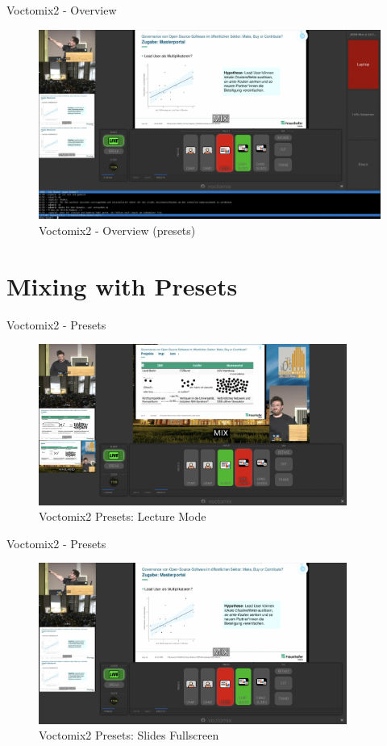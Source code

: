 
\begin{frame}{Voctomix2 - Overview}
	\begin{figure}
		\centering
		\includegraphics[width=.8\textwidth]{images/voctomix2-overview.jpg}
		\caption{Voctomix2 - Overview (presets)}
	\end{figure}
\end{frame}

\section{Mixing with Presets}
\begin{frame}{Voctomix2 - Presets}
	\begin{figure}
		\centering
		\includegraphics[width=0.9\textwidth]{images/voctomix2-presets-lecture.jpg}
		\caption{Voctomix2 Presets: Lecture Mode}
	\end{figure}
\end{frame}

\begin{frame}{Voctomix2 - Presets}
	\begin{figure}
		\centering
		\includegraphics[width=0.9\textwidth]{images/voctomix2-presets-slides.jpg}
		\caption{Voctomix2 Presets: Slides Fullscreen}
	\end{figure}
\end{frame}

